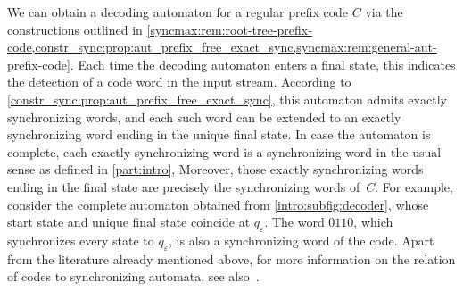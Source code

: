 We can obtain a decoding automaton for a regular prefix code $C$
via the constructions outlined in
\cref{syncmax:rem:root-tree-prefix-code,constr_sync:prop:aut_prefix_free_exact_sync,syncmax:rem:general-aut-prefix-code}.
Each time the decoding automaton enters a final state, this indicates
the detection of a code word in the input stream.
According to \cref{constr_sync:prop:aut_prefix_free_exact_sync},
this automaton admits exactly synchronizing words, and each such word
can be extended to an exactly synchronizing word ending in the unique
final state.
In case the automaton is complete, each exactly synchronizing word
is a synchronizing word in the usual sense as defined in \cref{part:intro},
Moreover, those exactly synchronizing words ending in the final state
are precisely the synchronizing words of~$C$.
For example, consider the complete automaton obtained from
\cref{intro:subfig:decoder}, whose start state and unique final state
coincide at $q_{\varepsilon}$.
The word $0110$, which synchronizes every state to $q_{\varepsilon}$,
is also a synchronizing word of the code.
Apart from the literature already mentioned above, for more information
on the relation of codes to synchronizing automata,
see also~\cite{BeaBerPer2011,DBLP:journals/tcs/CarpiD17,DBLP:conf/dlt/GusevP11,DBLP:phd/hal/Ryzhikov20}.

